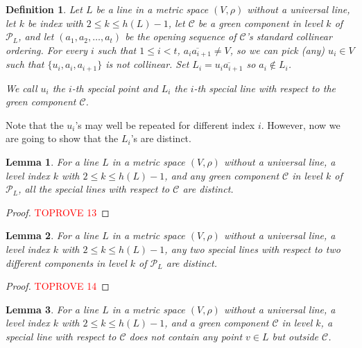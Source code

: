 \documentclass[12pt]{article}
\newcommand{\ov}{\overline}
\newtheorem{lem}{Lemma}
\newtheorem{defi}{Definition}
\begin{document}
\begin{defi}
Let $L$ be a line in a metric space $(V, \rho)$ without a universal line,
let $k$ be index with $2 \le k \le h(L)-1$,  
let $\mathcal{C}$ be a green component in level $k$ of $\mathcal{P}_L$,
and let $(a_1, a_2, \dots, a_t)$ be the opening sequence of $\mathcal{C}$'s standard collinear ordering.
For every $i$ such that $1 \le i < t$, $\ov{a_ia_{i+1}} \neq V$, so we can pick (any) $u_i \in V$
such that $\{u_i, a_i, a_{i+1}\}$ is not collinear. Set $L_i = \ov{u_i a_{i+1}}$
so $a_i \not\in L_i$.

We call $u_i$ the $i$-th special point and $L_i$ the $i$-th special line
with respect to the green component $\mathcal{C}$.
\end{defi}

Note that the $u_i$'s may well be repeated for different index $i$.
However, now we are going to show that the $L_i$'s are distinct.

\begin{lem}\label{lem.distinct_lines_samecpt}
For a line $L$ in a metric space $(V, \rho)$ without a universal line,
a level index $k$ with $2 \le k \le h(L)-1$,
and any green component $\mathcal{C}$ in level $k$ of $\mathcal{P}_L$,
all the special lines with respect to $\mathcal{C}$ are distinct. 
\end{lem}

\begin{proof}\textcolor{red}{TOPROVE 13}\end{proof}

\begin{lem}\label{lem.distinct_lines_diffcpt}
For a line $L$ in a metric space $(V, \rho)$ without a universal line,
a level index $k$ with $2 \le k \le h(L)-1$, any two special lines
with respect to two different components in level $k$ of $\mathcal{P}_L$ are distinct. 
\end{lem}

\begin{proof}\textcolor{red}{TOPROVE 14}\end{proof}

\begin{lem}\label{lem.distinct_lines_exclusive}
For a line $L$ in a metric space $(V, \rho)$ without a universal line,
a level index $k$ with $2 \le k \le h(L)-1$,
and a green component $\mathcal{C}$ in level $k$,
a special line with respect to $\mathcal{C}$ does not contain any point 
$v \in L$ but outside $\mathcal{C}$. 
\end{lem}
\end{document}
